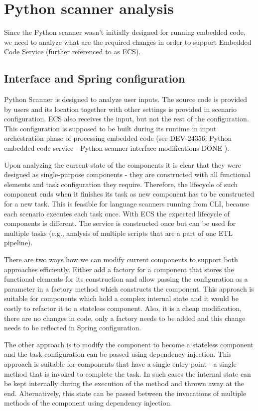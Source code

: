 \section{Python scanner analysis}

Since the Python scanner wasn't initially designed for running embedded code, we need to analyze what are the required changes in order to support Embedded Code Service (further referenced to as ECS).

\subsection{Interface and Spring configuration}
Python Scanner is designed to analyze user inputs. The source code is provided by users and its location together with other settings is provided in scenario configuration. ECS also receives the input, but not the rest of the configuration. This configuration is supposed to be built during its runtime in input orchestration phase of processing embedded code (see DEV-24356: Python embedded code service - Python scanner interface modifications
DONE
). 
\par
Upon analyzing the current state of the components it is clear that they were designed as single-purpose components - they are constructed with all functional elements and task configuration they require. Therefore, the lifecycle of such component ends when it finishes its task as new component has to be constructed for a new task. This is feasible for language scanners running from CLI, because each scenario executes each task once. With ECS the expected lifecycle of components is different. The service is constructed once but can be used for multiple tasks (e.g., analysis of multiple scripts that are a part of one ETL pipeline).
\par
There are two ways how we can modify current components to support both approaches efficiently. Either add a factory for a component that stores the functional elements for its construction and allow passing the configuration as a parameter in a factory method which constructs the component. This approach is suitable for components which hold a complex internal state and it would be costly to refactor it to a stateless component. Also, it is a cheap modification, there are no changes in code, only a factory needs to be added and this change needs to be reflected in Spring configuration.
\par
The other approach is to modify the component to become a stateless component and the task configuration can be passed using dependency injection. This approach is suitable for components that have a single entry-point - a single method that is invoked to complete the task. In such cases the internal state can be kept internally during the execution of the method and thrown away at the end. Alternatively, this state can be passed between the invocations of multiple methods of the component using dependency injection.

